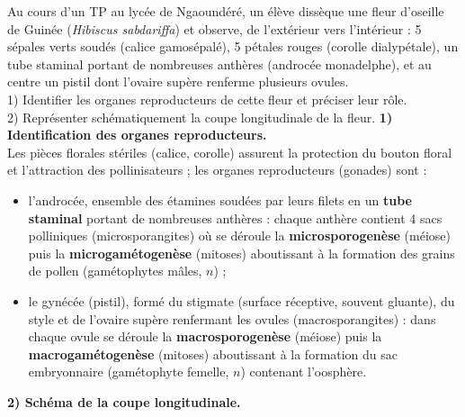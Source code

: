 \documentclass[11pt]{article}
\newcommand{\cle}[1]{{\popxbold\color{popdark}#1}}
\begin{document}
\begin{exoresolu}
Au cours d'un TP au lycée de Ngaoundéré, un élève dissèque une fleur d'oseille de Guinée (\emph{Hibiscus sabdariffa}) et observe, de l'extérieur vers l'intérieur : 5 sépales verts soudés (calice gamosépalé), 5 pétales rouges (corolle dialypétale), un tube staminal portant de nombreuses anthères (androcée monadelphe), et au centre un pistil dont l'ovaire supère renferme plusieurs ovules.\\
1) Identifier les organes reproducteurs de cette fleur et préciser leur rôle.\\
2) Représenter schématiquement la coupe longitudinale de la fleur.
\tcblower
\textbf{1) Identification des organes reproducteurs.}\\
Les pièces florales stériles (calice, corolle) assurent la protection du bouton floral et l'attraction des pollinisateurs ; les organes reproducteurs (gonades) sont :
\begin{itemize}
\item l'\cle{androcée}, ensemble des étamines soudées par leurs filets en un \textbf{tube staminal} portant de nombreuses anthères : chaque anthère contient 4 sacs polliniques (microsporangites) où se déroule la \textbf{microsporogenèse} (méiose) puis la \textbf{microgamétogenèse} (mitoses) aboutissant à la formation des grains de pollen (gamétophytes mâles, $n$) ;
\item le \cle{gynécée} (pistil), formé du stigmate (surface réceptive, souvent gluante), du style et de l'ovaire supère renfermant les ovules (macrosporangites) : dans chaque ovule se déroule la \textbf{macrosporogenèse} (méiose) puis la \textbf{macrogamétogenèse} (mitoses) aboutissant à la formation du sac embryonnaire (gamétophyte femelle, $n$) contenant l'oosphère.
\end{itemize}
\textbf{2) Schéma de la coupe longitudinale.}
\begin{popfigure}
\end{popfigure}
\end{exoresolu}
\end{document}
